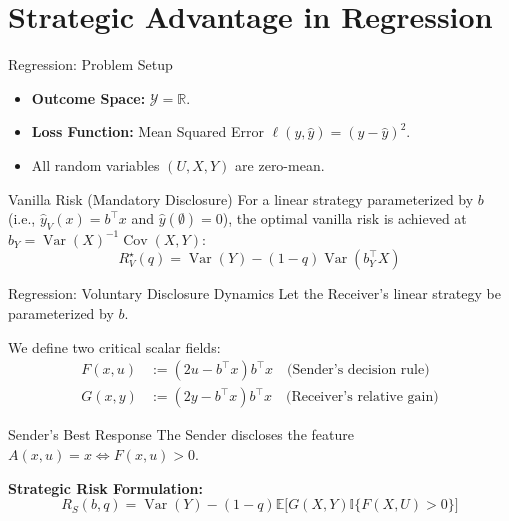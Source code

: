 \documentclass[10pt, aspectratio=169]{beamer}
\newcommand{\R}{\mathbb{R}}
\newcommand{\E}{\mathbb{E}}
\DeclareMathOperator{\Var}{Var}
\DeclareMathOperator{\Cov}{Cov}
\newcommand{\Ind}[1]{\mathbb{I}\{#1\}}
\newcommand{\cY}{\mathcal{Y}}
\begin{document}
\section{Strategic Advantage in Regression}

\begin{frame}{Regression: Problem Setup}
    \begin{itemize}
        \item \textbf{Outcome Space:} $\cY = \R$.
        \item \textbf{Loss Function:} Mean Squared Error $\ell(y, \hat{y}) = (y - \hat{y})^2$.
        \item All random variables $(U, X, Y)$ are zero-mean.
    \end{itemize}
    \vspace{0.3cm}
    \begin{exampleblock}{Vanilla Risk (Mandatory Disclosure)}
      For a linear strategy parameterized by $b$ (i.e., $\hat{y}_V(x) = b^\top x$ and $\hat{y}(\emptyset) = 0$), the optimal vanilla risk is achieved at $b_Y = \Var(X)^{-1}\Cov(X,Y)$:
      \begin{equation*}
          R_V^\star(q) = \Var(Y) - (1-q) \Var(b_Y^\top X)
      \end{equation*}
    \end{exampleblock}
\end{frame}

\begin{frame}{Regression: Voluntary Disclosure Dynamics}
    Let the Receiver's linear strategy be parameterized by $b$.
    
    We define two critical scalar fields:
    \begin{align*}
        F(x,u) &:= (2u - b^\top x) b^\top x \quad \text{(Sender's decision rule)}\\
        G(x,y) &:= (2y - b^\top x) b^\top x \quad \text{(Receiver's relative gain)}
    \end{align*}
    
    \begin{block}{Sender's Best Response}
        The Sender discloses the feature $A(x,u)=x \iff F(x,u) > 0$.
    \end{block}
    
    \textbf{Strategic Risk Formulation:}
    \begin{equation*}
        R_S(b, q) = \Var(Y) - (1-q)\E\big[G(X,Y)\Ind{F(X,U) > 0}\big]
    \end{equation*}
\end{frame}
\end{document}
